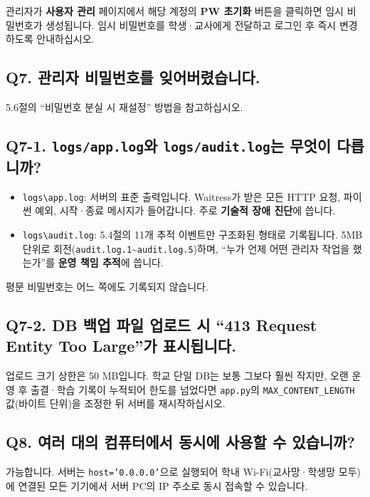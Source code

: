 \documentclass[a4paper,12pt]{article}
\newcommand{\menu}[1]{\textcolor{primary}{\textbf{#1}}}
\begin{document}
관리자가 \menu{사용자 관리} 페이지에서 해당 계정의 \menu{PW 초기화} 버튼을 클릭하면
임시 비밀번호가 생성됩니다. 임시 비밀번호를 학생·교사에게 전달하고
로그인 후 즉시 변경하도록 안내하십시오.

\subsection*{Q7. 관리자 비밀번호를 잊어버렸습니다.}

5.6절의 ``비밀번호 분실 시 재설정'' 방법을 참고하십시오.

\subsection*{Q7-1. \texttt{logs/app.log}와 \texttt{logs/audit.log}는 무엇이 다릅니까?}

\begin{itemize}[leftmargin=1.5em]
  \item \texttt{logs\textbackslash app.log}: 서버의 표준 출력입니다.
        Waitress가 받은 모든 HTTP 요청, 파이썬 예외, 시작·종료 메시지가 들어갑니다.
        주로 \textbf{기술적 장애 진단}에 씁니다.
  \item \texttt{logs\textbackslash audit.log}: 5.4절의 11개 추적 이벤트만
        구조화된 형태로 기록됩니다. 5MB 단위로 회전(\texttt{audit.log.1}\textasciitilde\texttt{audit.log.5})하며,
        ``누가 언제 어떤 관리자 작업을 했는가''를 \textbf{운영 책임 추적}에 씁니다.
\end{itemize}

평문 비밀번호는 어느 쪽에도 기록되지 않습니다.

\subsection*{Q7-2. DB 백업 파일 업로드 시 ``413 Request Entity Too Large''가 표시됩니다.}

업로드 크기 상한은 50 MB입니다. 학교 단일 DB는 보통 그보다 훨씬 작지만,
오랜 운영 후 출결·학습 기록이 누적되어 한도를 넘었다면
\texttt{app.py}의 \texttt{MAX\_CONTENT\_LENGTH} 값(바이트 단위)을 조정한 뒤 서버를 재시작하십시오.

\subsection*{Q8. 여러 대의 컴퓨터에서 동시에 사용할 수 있습니까?}

가능합니다. 서버는 \texttt{host='0.0.0.0'}으로 실행되어 학내 Wi-Fi(교사망·학생망 모두)에
연결된 모든 기기에서 서버 PC의 IP 주소로 동시 접속할 수 있습니다.
\end{document}
